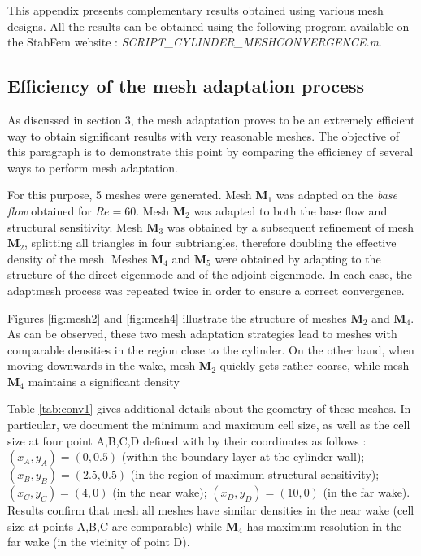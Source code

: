 \documentclass[twocolumn,10pt]{asme2ej}
\begin{document}
This appendix presents complementary results obtained using various mesh designs. 
All the results can be obtained using the following program available on the StabFem website : 
{\em SCRIPT\_CYLINDER\_MESHCONVERGENCE.m}.

\subsection{Efficiency of the mesh adaptation process}

As discussed in section 3, the mesh adaptation proves to be an extremely efficient way to obtain significant results 
with very reasonable meshes. The objective of this paragraph is to demonstrate this point by comparing the efficiency of several ways to perform mesh adaptation. 

For this purpose, 5 meshes were generated. 
Mesh $\mathbf{M}_1$ was adapted on the {\em base flow} obtained for $Re=60$.
Mesh $\mathbf{M}_2$ was adapted to both the base flow and structural sensitivity.
Mesh $\mathbf{M}_3$ was obtained by a subsequent refinement of mesh $\mathbf{M}_2$, splitting all triangles in four subtriangles, therefore doubling the effective density of the mesh.
Meshes $\mathbf{M}_4$ and $\mathbf{M}_5$ were obtained by adapting to the structure of the direct eigenmode and of the adjoint eigenmode.
In each case, the adaptmesh process was repeated twice in order to ensure a correct convergence.

Figures \ref{fig:mesh2} and \ref{fig:mesh4} illustrate the structure of meshes $\mathbf{M}_2$ and $\mathbf{M}_4$. As can be observed, these two mesh adaptation strategies lead to meshes with comparable densities in the region close to the cylinder. On the other hand, when moving downwards in the wake, mesh $\mathbf{M}_2$ quickly gets rather coarse, while mesh $\mathbf{M}_4$ maintains a significant density  

Table \ref{tab:conv1} gives additional details about the geometry of these meshes. In particular, we document the minimum and maximum cell size, as well as the cell size at four point A,B,C,D defined with by their coordinates as follows : $(x_A,y_A) = (0,0.5)$ (within the boundary layer at the cylinder wall); $(x_B,y_B) = (2.5,0.5)$ (in the region of maximum structural sensitivity); $(x_C,y_C) = (4,0)$ (in the near wake); $(x_D,y_D) = (10,0)$ (in the far wake). Results confirm that mesh all meshes have similar densities in the near wake (cell size at points A,B,C are comparable) 
while $\mathbf{M}_4$ has maximum resolution in the far wake (in the vicinity of point D).
\end{document}
